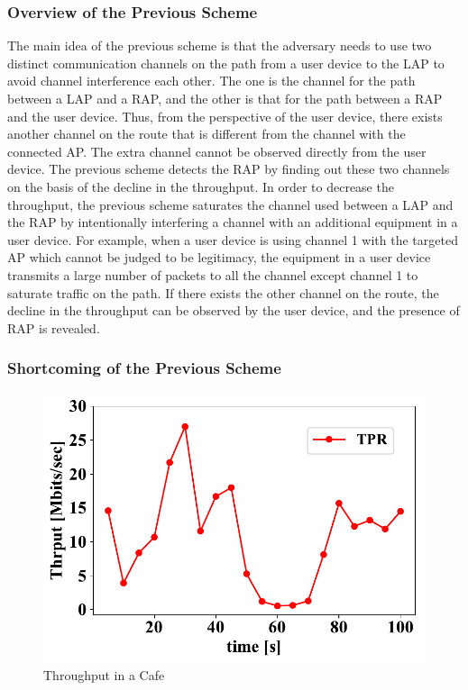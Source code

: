 \documentclass[conference]{IEEEtran}
\begin{document}
\subsubsection{Overview of the Previous Scheme}
The main idea of the previous scheme \cite{previous} is that the adversary needs to use two distinct communication channels on the path from a user device to the LAP to avoid channel interference each other.
The one is the channel for the path between a LAP and a RAP, and the other is that for the path between a RAP and the user device.
Thus, from the perspective of the user device, there exists another channel on the route that is different from the channel with the connected AP.
The extra channel cannot be observed directly from the user device.
The previous scheme detects the RAP by finding out these two channels on the basis of the decline in the throughput.
In order to decrease the throughput, the previous scheme saturates the channel used between a LAP and the RAP by intentionally interfering a channel with an additional equipment in a user device.
For example, when a user device is using channel 1 with the targeted AP which cannot be judged to be legitimacy, the equipment in a user device transmits a large number of packets to all the channel except channel 1 to saturate traffic on the path.
If there exists the other channel on the route, the decline in the throughput can be observed by the user device, and the presence of RAP is revealed.

\subsubsection{Shortcoming of the Previous Scheme}\label{sec:shortcoming}
\begin{figure}[t]
    \begin{center}
        \includegraphics[scale=0.5]{image/Thrput.pdf}
        \caption{Throughput in a Cafe}
        \label{thrput}
    \end{center}
\end{figure}
\end{document}
